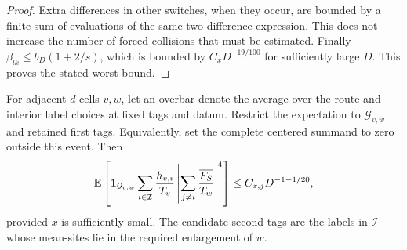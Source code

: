 \begin{proof}
Extra differences in other switches, when they occur, are bounded
by a finite sum of evaluations of the same two-difference expression.
This does not increase the number of forced collisions that must be
estimated.  Finally $\beta_{lk}\le b_D(1+2/s)$, which is bounded by
$C_xD^{-19/100}$ for sufficiently large $D$.  This proves the stated
worst bound.
\end{proof}

\begin{lemma}
\label{palm:fourth}
For adjacent $d$-cells $v,w$, let an overbar denote the average over
the route and interior label choices at fixed tags and datum.  Restrict
the expectation to $\mathcal G_{v,w}$ and retained first tags.  Equivalently,
set the complete centered summand to zero outside this event.  Then
\begin{equation}\label{palm:fourth-centered}
 \mathbb E\left[\mathbf 1_{\mathcal G_{v,w}}
       \sum_{i\in\mathcal I}\frac{h_{v,i}}{T_v}
    \left|\sum_{j\ne i}\frac{\overline{F_S}}{T_w}\right|^4\right]
          \le C_{x,j}D^{-1-1/20},
\end{equation}
provided $x$ is sufficiently small.  The candidate second tags are
the labels in $\mathcal I$ whose mean-sites lie in the required enlargement
of $w$.
\end{lemma}


